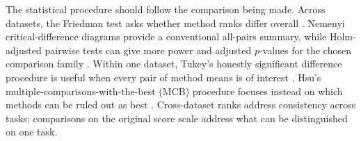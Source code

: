The statistical procedure should follow the comparison being made. Across datasets, the Friedman
test asks whether method ranks differ overall \citep{demsar2006statistical}. Nemenyi
critical-difference diagrams provide a conventional all-pairs summary, while Holm-adjusted pairwise
tests can give more power and adjusted $p$-values for the chosen comparison family
\citep{garcia2008extension}. Within one dataset, Tukey's honestly significant difference procedure
is useful when every pair of method means is of interest \citep{ash2025practically}. Hsu's
multiple-comparisons-with-the-best (MCB) procedure focuses instead on which methods can be ruled out
as best \citep{hsu1984constrained}. Cross-dataset ranks address consistency across tasks; comparisons
on the original score scale address what can be distinguished on one task.
